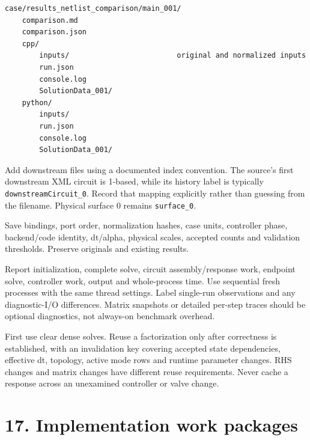 \documentclass[11pt,a4paper]{article}
\begin{document}
\begin{lstlisting}
case/results_netlist_comparison/main_001/
    comparison.md
    comparison.json
    cpp/
        inputs/                         original and normalized inputs
        run.json
        console.log
        SolutionData_001/
    python/
        inputs/
        run.json
        console.log
        SolutionData_001/
\end{lstlisting}
Add downstream files using a documented index convention. The source's first downstream XML circuit is 1-based, while its history label is typically \texttt{downstream\allowbreak{}Circuit\_\allowbreak{}0}. Record that mapping explicitly rather than guessing from the filename. Physical surface 0 remains \texttt{surface\_\allowbreak{}0}.

Save bindings, port order, normalization hashes, case units, controller phase, backend/code identity, dt/alpha, physical scales, accepted counts and validation thresholds. Preserve originals and existing results.

Report initialization, complete solve, circuit assembly/response work, endpoint solve, controller work, output and whole-process time. Use sequential fresh processes with the same thread settings. Label single-run observations and any diagnostic-I/O differences. Matrix snapshots or detailed per-step traces should be optional diagnostics, not always-on benchmark overhead.

First use clear dense solves. Reuse a factorization only after correctness is established, with an invalidation key covering accepted state dependencies, effective dt, topology, active mode rows and runtime parameter changes. RHS changes and matrix changes have different reuse requirements. Never cache a response across an unexamined controller or valve change.

\section{17. Implementation work packages}
\end{document}
